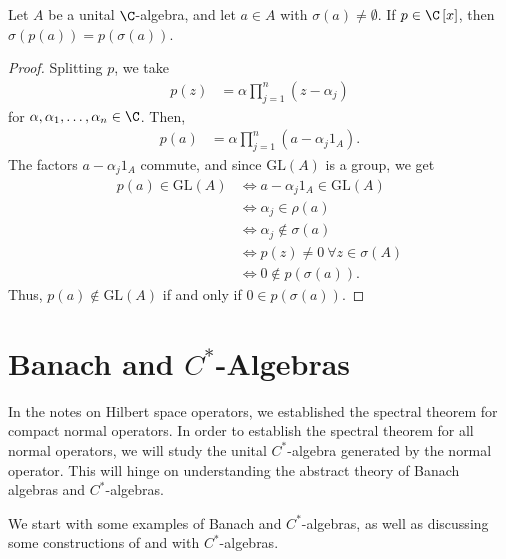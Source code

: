 \documentclass[10pt]{mypackage}
\newcommand{\GL}{\text{GL}}
\begin{document}
\begin{proposition}
  Let $A$ be a unital $\C$-algebra, and let $a\in A$ with $\sigma\left(a\right)\neq \emptyset$. If $p\in \C\left[x\right]$, then $\sigma\left(p(a)\right) = p\left(\sigma(a)\right)$.
\end{proposition}
\begin{proof}
  Splitting $p$, we take
  \begin{align*}
    p(z) &= \alpha \prod_{j=1}^{n}\left(z-\alpha_j\right)
  \end{align*}
  for $\alpha,\alpha_1,\dots,\alpha_n\in \C$. Then,
  \begin{align*}
    p\left(a\right) &= \alpha \prod_{j=1}^{n}\left(a-\alpha_j 1_{A}\right).
  \end{align*}
  The factors $a - \alpha_j1_A$ commute, and since $\GL(A)$ is a group, we get
  \begin{align*}
    p(a)\in \GL\left(A\right) &\Leftrightarrow a - \alpha_j1_A \in \GL\left(A\right)\\
                              &\Leftrightarrow \alpha_j\in \rho\left(a\right)\\
                              &\Leftrightarrow \alpha_j\notin \sigma\left(a\right)\\
                              &\Leftrightarrow p(z)\neq 0~\forall z\in \sigma\left(A\right)\\
                              &\Leftrightarrow 0\notin p\left(\sigma\left(a\right)\right).
  \end{align*}
  Thus, $p\left(a\right)\notin \GL\left(A\right)$ if and only if $0\in p\left(\sigma\left(a\right)\right)$.
\end{proof}

\section{Banach and $C^{\ast}$-Algebras}%
In the notes on Hilbert space operators, we established the spectral theorem for compact normal operators. In order to establish the spectral theorem for all normal operators, we will study the unital $C^{\ast}$-algebra generated by the normal operator. This will hinge on understanding the abstract theory of Banach algebras and $C^{\ast}$-algebras.\newline

We start with some examples of Banach and $C^{\ast}$-algebras, as well as discussing some constructions of and with $C^{\ast}$-algebras.
\end{document}
